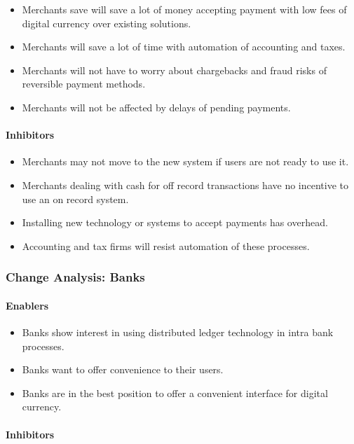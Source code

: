 \documentclass[a4paper,12pt]{article} %
\begin{document}
{\begin{itemize}
	\item Merchants save will save a lot of money accepting payment with low fees of digital currency over existing solutions.
	\item Merchants will save a lot of time with automation of accounting and taxes.
	\item Merchants will not have to worry about chargebacks and fraud risks of reversible payment methods.
	\item Merchants will not be affected by delays of pending payments.
\end{itemize}

\paragraph*{Inhibitors}

\begin{itemize}
	\item Merchants may not move to the new system if users are not ready to use it.
	\item Merchants dealing with cash for off record transactions have no incentive to use an on record system.
	\item Installing new technology or systems to accept payments has overhead.
	\item Accounting and tax firms will resist automation of these processes.
\end{itemize}

\subsubsection{Change Analysis: Banks} \label{sssec:4.5:banks}

\paragraph*{Enablers}

\begin{itemize}
	\item Banks show interest in using distributed ledger technology in intra bank processes.
	\item Banks want to offer convenience to their users.
	\item Banks are in the best position to offer a convenient interface for digital currency.
\end{itemize}

\paragraph*{Inhibitors}

}
\end{document}
